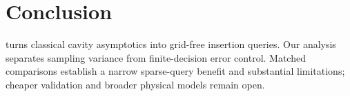 \section{Conclusion}
\label{sec:conclusion}

\method{} turns classical cavity asymptotics into grid-free insertion queries.
Our analysis separates sampling variance from finite-decision error control.
Matched comparisons establish a narrow sparse-query benefit and substantial
limitations; cheaper validation and broader physical models remain open.
